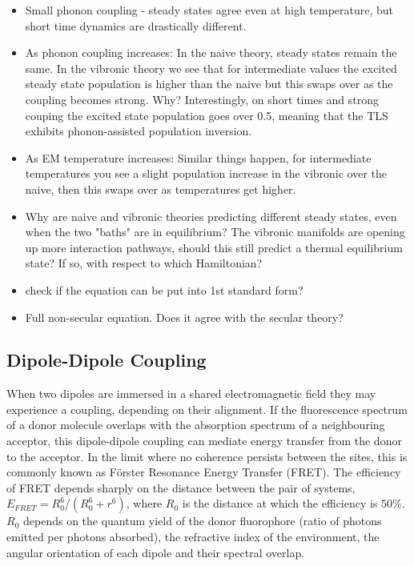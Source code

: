 \documentclass[]{article}
\begin{document}
\begin{itemize}
	\item Small phonon coupling - steady states agree even at high temperature, but short time dynamics are drastically different.
	\item As phonon coupling increases: In the naive theory, steady states remain the same. In the vibronic theory we see that for intermediate values the excited steady state population is higher than the naive but this swaps over as the coupling becomes strong. Why? Interestingly, on short times and strong couping the excited state population goes over 0.5, meaning that the TLS exhibits phonon-assisted population inversion.
	\item As EM temperature increases: Similar things happen, for intermediate temperatures you see a slight population increase in the vibronic over the naive, then this swaps over as temperatures get higher.
	\item Why are naive and vibronic theories predicting different steady states, even when the two "baths" are in equilibrium? The vibronic manifolds are opening up more interaction pathways, should this still predict a thermal equilibrium state? If so, with respect to which Hamiltonian?
	\item check if the equation can be put into 1st standard form?
	\item Full non-secular equation. Does it agree with the secular theory?
\end{itemize}

\subsection{Dipole-Dipole Coupling}
\label{ssec:NonInteracting}
When two dipoles are immersed in a shared electromagnetic field they may experience a coupling, depending on their alignment. If the fluorescence spectrum of a donor molecule overlaps with the absorption spectrum of a neighbouring acceptor, this dipole-dipole coupling can mediate energy transfer from the donor to the acceptor. In the limit where no coherence persists between the sites, this is commonly known as F\"orster Resonance Energy Transfer (FRET). The efficiency of FRET\cite{Hussain_FRET} depends sharply on the distance between the pair of systems, $E_{FRET}=R_0^{6}/(R_0^{6}+r^6)$, where $R_0$ is the distance at which the efficiency is $50\%$. $R_0$ depends on the quantum yield of the donor fluorophore (ratio of photons emitted per photons absorbed), the refractive index of the environment, the angular orientation of each dipole and their spectral overlap.
\end{document}
